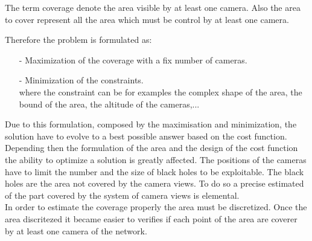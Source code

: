 The term coverage denote the area visible by at least one camera. Also the area to cover represent all the area which must be control by at least one camera. 

Therefore the problem is formulated as:
\begin{itemize}
\item [-] Maximization of the coverage with a fix number of cameras.
\item [-] Minimization of the constraints.\\  where the constraint can be for examples the complex shape of the area, the bound of the area, the altitude of the cameras,...
\end{itemize}



Due to this formulation, composed by the maximisation and minimization, the solution  have to evolve to a best  possible answer based on the cost function. Depending then the formulation of the area and the design of the cost function the ability to optimize a solution is greatly affected. 
The positions of the cameras have to limit the number and the size of black
holes to be exploitable. The black holes are the area not covered by the camera
views. To do so a precise estimated of the part covered by the system of camera views is elemental.\\


In order to estimate the coverage properly the area must be discretized. Once the area discritezed it became easier to verifies if each point of the area are coverer by at least one camera of the network.
%

